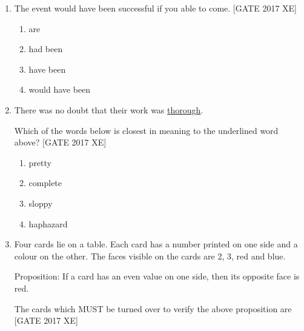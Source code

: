 \documentclass[journal,12pt,onecolumn]{IEEEtran}
\theoremstyle{remark}
\begin{document}
\begin{enumerate}
\hfill [GATE 2017 XE]

\begin{multicols}{2}
\begin{enumerate}
    \item  $\rho_{w}=\frac{2}{9}\frac{\mu U}{r^{2}g}$
\item $\rho_{w}=\frac{9}{2}\frac{\mu U}{r^{2}g}$
\item $\rho_{w}=\frac{9}{4}\frac{\mu U}{r^{2}g}$
\item $\rho_{w}=\frac{4}{9}\frac{\mu U}{r^{2}g}$
\end{enumerate}
\end{multicols}
\item The event would have been successful if you \underline{\hspace{1.5cm}} able to come.  
\hfill [GATE 2017 XE]

\begin{multicols}{2}
\begin{enumerate}
    \item are
    \item had been
    \item have been
    \item would have been
\end{enumerate}
\end{multicols}

\item There was no doubt that their work was \underline{thorough}.  

Which of the words below is closest in meaning to the underlined word above?  
\hfill [GATE 2017 XE]

\begin{multicols}{2}
\begin{enumerate}
    \item pretty
    \item complete
    \item sloppy
    \item haphazard
\end{enumerate}
\end{multicols}

\item Four cards lie on a table. Each card has a number printed on one side and a colour on the other.  
The faces visible on the cards are 2, 3, red and blue.  

Proposition: If a card has an even value on one side, then its opposite face is red.  

The cards which MUST be turned over to verify the above proposition are \hfill [GATE 2017 XE]


\end{enumerate}
\end{document}
